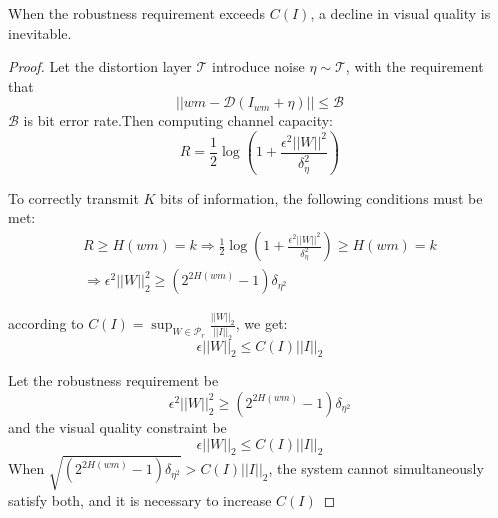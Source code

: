 \begin{proposition}
When the robustness requirement exceeds $C(I)$, a decline in visual quality is inevitable.
\end{proposition}

\begin{proof}
Let the distortion layer $\mathcal{T}$ introduce noise $\eta \sim \mathcal{T}$, with the requirement that
$$||wm-\mathcal{D}(I_{wm} + \eta)|| \le \mathcal{B}$$
$\mathcal{B}$ is bit error rate.Then computing channel capacity:
$$R=\frac{1}{2}\log(1+\frac{\epsilon^2||W||^2}{\delta_{\eta}^2})$$

To correctly transmit $K$ bits of information, the following conditions must be met:
\begin{align*}
    R \ge H(wm) = k \Rightarrow \frac{1}{2}\log(1+\frac{\epsilon^2||W||^2}{\delta_{\eta}^2}) \ge H(wm) = k\\
    \Rightarrow \epsilon^2||W||^2_2 \ge (2^{2H(wm)}-1)\delta_{\eta^2}
\end{align*}





according to $C(I) = \sup_{W \in \mathcal{P}_r}{\frac{||W||_2}{||I||_2}} $, 
we get:
$$
\epsilon||W||_2 \le C(I)||I||_2
$$

Let the robustness requirement be $$\epsilon^2||W||^2_2 \ge (2^{2H(wm)}-1)\delta_{\eta^2}$$ 
and the visual quality constraint be $$\epsilon||W||_2 \le C(I)||I||_2$$
When $\sqrt{(2^{2H(wm)}-1)\delta_{\eta^2}} > C(I)||I||_2$, the system cannot simultaneously satisfy both, and it is necessary to increase $C(I)$
\end{proof}